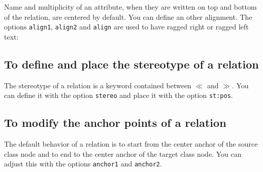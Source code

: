 \documentclass[a4paper,11pt]{report}
\begin{document}
Name and multiplicity of an attribute, when they are written on top and bottom of the relation, are centered by default. You can define an other alignment.
The options {\tt align1}, {\tt align2} and {\tt align} are used to have ragged right or ragged left text:

\medskip

\begin{minipage}{0.5\textwidth}
	
\end{minipage}
\begin{minipage}{0.4\textwidth}
	\begin{center}
	\end{center}
\end{minipage}

\subsection{To define and place the stereotype of a relation}\label{ss.relstereo}

The stereotype of a relation is a keyword contained between $\ll$ and $\gg$.
You can define it with the option {\tt stereo} and place it with the option \hypertarget{posstereo}{{\tt st:pos}}.

\medskip

\begin{minipage}{0.5\textwidth}
	
\end{minipage}
\begin{minipage}{0.4\textwidth}
	\begin{center}
	\end{center}
\end{minipage}

\subsection{To modify the anchor points of a relation}\label{ss.relanchor}

The default behavior of a relation is to start from the center anchor of the source class node and to end to the center anchor of the target class node.
You can adjust this with the options \hypertarget{anchor1}{{\tt anchor1}} and \hypertarget{anchor2}{{\tt anchor2}}.

\medskip

\begin{minipage}{0.6\textwidth}
	
\end{minipage}
\begin{minipage}{0.4\textwidth}
	\begin{center}
	\end{center}
\end{minipage}
\end{document}
